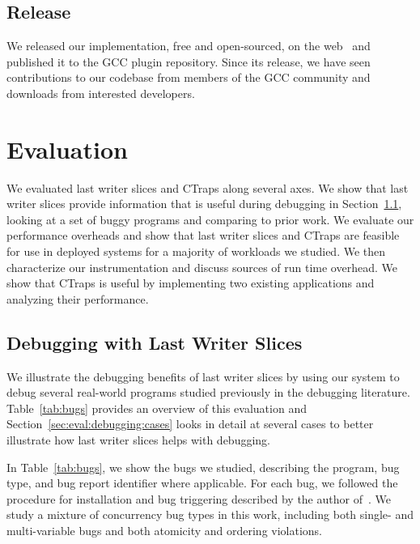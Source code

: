 \documentclass[preprint,10pt]{sigplanconf}
\newcommand{\ctraps}{CTraps\xspace}
\begin{document}
\subsection{Release}
We released our implementation, free and open-sourced, on the
web~\cite{ctrapsrelease} and published it to the GCC plugin repository.
Since its release, we have seen contributions to our codebase from members of
the GCC community and downloads from interested developers.

\section{Evaluation}
\label{sec:eval}
We evaluated last writer slices and \ctraps along several axes.  We show that
last writer slices provide information that is useful during debugging in
Section~\ref{sec:eval:debugging}, looking at a set of buggy programs and
comparing to prior work.  We evaluate our performance overheads and
show that last writer slices and \ctraps are feasible for use in deployed
systems for a majority of workloads we studied.  We then characterize our
instrumentation and discuss sources of run time overhead.   We
show that \ctraps is useful by implementing two existing applications and
analyzing their performance.    

\subsection{Debugging with Last Writer Slices}
\label{sec:eval:debugging}

We illustrate the debugging benefits of last writer slices by using our system
to debug several real-world programs studied previously in the debugging
literature.  Table~\ref{tab:bugs} provides an overview of this evaluation and
Section~\ref{sec:eval:debugging:cases} looks in detail at several cases to 
better illustrate how last writer slices helps with debugging.

In Table~\ref{tab:bugs}, we show the bugs we studied, describing the program,
bug type, and bug report identifier where applicable.  For each bug, we
followed the procedure for installation and bug triggering described by the
author of~\cite{concurrencybugs}.  We study a mixture of concurrency bug types
in this work, including both single- and multi-variable bugs and both atomicity
and ordering violations.
\end{document}
